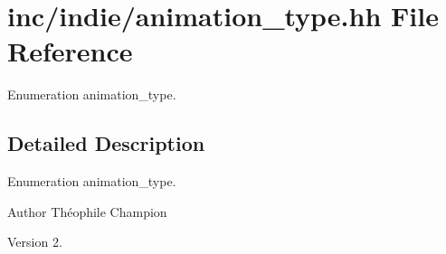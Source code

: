 \hypertarget{animation__type_8hh}{}\section{inc/indie/animation\+\_\+type.hh File Reference}
\label{animation__type_8hh}


Enumeration animation\+\_\+type.  




\subsection{Detailed Description}
Enumeration animation\+\_\+type. 

\begin{DoxyAuthor}{Author}
Théophile Champion 
\end{DoxyAuthor}
\begin{DoxyVersion}{Version}
2. 
\end{DoxyVersion}
